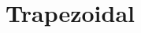 \documentclass[10pt, oneside]{article}
\begin{document}
\begin{comment}
\section{Continuous Case}
The strong form is
\[ \bar u_{t} + (c \bar u)_{x} - \bar s = 0 \]
%
Then the linearized equation is given by
%
\[ u_{t} + (c u)_{x} - s = 0 \]
%
Where we have assumed that $c$ is a fixed material property and that $\bar s$ is the control variable and $s$ is a perturbation of $\bar s$.
% 
We then introduce a weighting function $w$ and integrate over the space-time  domain, $Q$
%
\[ \int_Q w \left( u_{t} + (c u)_{x} - s \right) \; dQ = 0 \]
%
\[ \int_Q (w u)_t + (w c u)_x  \;dQ - \int_Q w_{t} u + w_x (c u) + w s \; dQ  = 0 \]
%
Use backward Euler in time yields
%
\begin{eqnarray}
\sum_{i=1}^n \int_\Omega w^{i-1}\left( u^i - u^{i-1} \right) \; d\Omega + 
  \Delta t \int_\Omega w^{i-1} \left( c u^{i} \right)_x \; d\Omega -
  w^{i-1} s^i  + \\
  u^i (\bar u^i - d ) - u^i (\bar u^i - d ) \; d\Omega
  + \sum_{i=1}^n \int_\Omega (w^i u^i - w^{i-1} u^{i-1} ) \; d\Omega 
\end{eqnarray}
%
So the adjoint equation becomes
%
\[ \sum_{i=1}^n \int_\Omega w^{i-1}\left( u^i - u^{i-1} \right) \; d\Omega - 
   \Delta t \int_\Omega w^{i-1}_x c u^{i} \; d\Omega - u^i (\bar u^i - d ) \; d\Omega = 0 \]
%
\[ w^0 ( u^1 - u^0 ) + w^1 ( u^2 - u^1 ) \]
%
\[ u^0 ( w^0 ) + u^1 ( w^0 - w^1 ) + u^2 w^1 \]

and the gradient equation is
%
\[  \sum_{i=1}^n \int_\Omega u^i (\bar u^i - d ) - w^{i-1} s^i  \; dQ = 0 \]

What about the objective functional
\[ J = \frac{\alpha}{2}\int_Q (\bar u-d)^2 \; dQ \]
Therefore
\[ J' = \alpha\int_Q (\bar u-d) u\; dQ \]
%
\end{comment}
\section{Trapezoidal}
\end{document}
